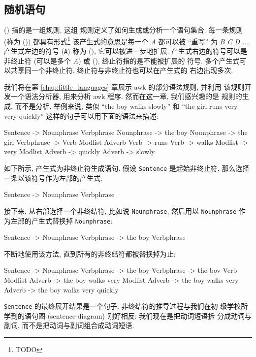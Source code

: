 \subsection{随机语句}
\label{subsec:random_sentences}

 () 指的是一组规则, 这组
规则定义了如何生成或分析一个语句集合. 每一条规则 (称为 
()) 都具有形式\footnote{TODO}
该产生式的意思是每一个 \textit{A} 都可以被 ``重写'' 为 \textit{B C D ...}.
产生式左边的符号 (\texttt{A}) 称为  (),
它可以被进一步地扩展. 产生式右边的符号可以是非终止符 (可以是多个
\textit{A}) 或  (), 终止符指的是不能被扩展的
符号. 多个产生式可以共享同一个非终止符, 终止符与非终止符也可以在产生式的
右边出现多次.

我们将在第 \ref{chap:little_languages} 章展示 awk 的部分语法规则, 并利用
该规则开发一个语法分析器, 用来分析 awk 程序. 然而在这一章, 我们感兴趣的是
规则的生成, 而不是分析. 举例来说, 类似 ``the boy walks slowly'' 和 ``the
girl runs very very quickly'' 这样的句子可以用下面的语法来描述:
\begin{file}
    Sentence -> Nounphrase Verbphrase
    Nounphrase -> the boy
    Nounphrase -> the girl
    Verbphrase -> Verb Modlist Adverb
    Verb -> runs
    Verb -> walks
    Modlist -> very Modlist
    Adverb -> quickly
    Adverb -> slowly
\end{file}

如下所示, 产生式为非终止符生成语句. 假设 \texttt{Sentence} 是起始非终止符,
那么选择一条以该符号作为左部的产生式:
\begin{file}
    Sentence -> Nounphrase Verbphrase
\end{file}
接下来, 从右部选择一个非终结符, 比如说 \texttt{Nounphrase}, 然后用以
\texttt{Nounphrase} 作为左部的产生式替换掉 \texttt{Nounphrase}:
\begin{file}
    Sentence -> Nounphrase Verbphrase
             -> the boy Verbphrase
\end{file}
不断地使用该方法, 直到所有的非终结符都被替换掉为止:
\begin{file}
    Sentence -> Nounphrase Verbphrase
             -> the boy Verbphrase
             -> the bov Verb Modlist Adverb
             -> the boy walks very Modlist Adverb
             -> the boy walks very Adverb
             -> the boy walks very quickly
\end{file}
\texttt{Sentence} 的最终展开结果是一个句子. 非终结符的推导过程与我们在初
级学校所学到的语句图 (sentence-diagram) 刚好相反: 我们现在是把动词短语拆
分成动词与副词, 而不是把动词与副词组合成动词短语.

